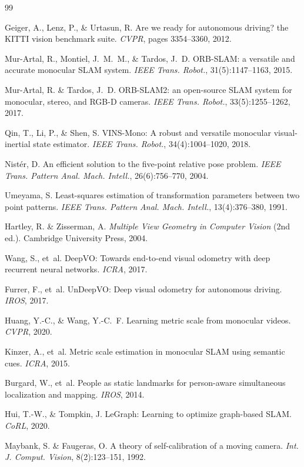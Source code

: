 \documentclass[12pt,a4paper]{article}
\begin{document}
\begin{thebibliography}{99}

Geiger, A., Lenz, P., \& Urtasun, R.
\newblock Are we ready for autonomous driving? the KITTI vision benchmark suite.
\newblock \emph{CVPR}, pages 3354--3360, 2012.

Mur-Artal, R., Montiel, J.~M.~M., \& Tardos, J.~D.
\newblock ORB-SLAM: a versatile and accurate monocular SLAM system.
\newblock \emph{IEEE Trans. Robot.}, 31(5):1147--1163, 2015.

Mur-Artal, R. \& Tardos, J.~D.
\newblock ORB-SLAM2: an open-source SLAM system for monocular, stereo, and RGB-D cameras.
\newblock \emph{IEEE Trans. Robot.}, 33(5):1255--1262, 2017.

Qin, T., Li, P., \& Shen, S.
\newblock VINS-Mono: A robust and versatile monocular visual-inertial state estimator.
\newblock \emph{IEEE Trans. Robot.}, 34(4):1004--1020, 2018.

Nist\'er, D.
\newblock An efficient solution to the five-point relative pose problem.
\newblock \emph{IEEE Trans. Pattern Anal. Mach. Intell.}, 26(6):756--770, 2004.

Umeyama, S.
\newblock Least-squares estimation of transformation parameters between two point patterns.
\newblock \emph{IEEE Trans. Pattern Anal. Mach. Intell.}, 13(4):376--380, 1991.

Hartley, R. \& Zisserman, A.
\newblock \emph{Multiple View Geometry in Computer Vision} (2nd ed.).
\newblock Cambridge University Press, 2004.

Wang, S., et~al.
\newblock DeepVO: Towards end-to-end visual odometry with deep recurrent neural networks.
\newblock \emph{ICRA}, 2017.

Furrer, F., et~al.
\newblock UnDeepVO: Deep visual odometry for autonomous driving.
\newblock \emph{IROS}, 2017.

Huang, Y.-C., \& Wang, Y.-C.~F.
\newblock Learning metric scale from monocular videos.
\newblock \emph{CVPR}, 2020.

Kinzer, A., et~al.
\newblock Metric scale estimation in monocular SLAM using semantic cues.
\newblock \emph{ICRA}, 2015.

Burgard, W., et~al.
\newblock People as static landmarks for person-aware simultaneous localization and mapping.
\newblock \emph{IROS}, 2014.

Hui, T.-W., \& Tompkin, J.
\newblock LeGraph: Learning to optimize graph-based SLAM.
\newblock \emph{CoRL}, 2020.

Maybank, S. \& Faugeras, O.
\newblock A theory of self-calibration of a moving camera.
\newblock \emph{Int. J. Comput. Vision}, 8(2):123--151, 1992.

\end{thebibliography}
\end{document}
